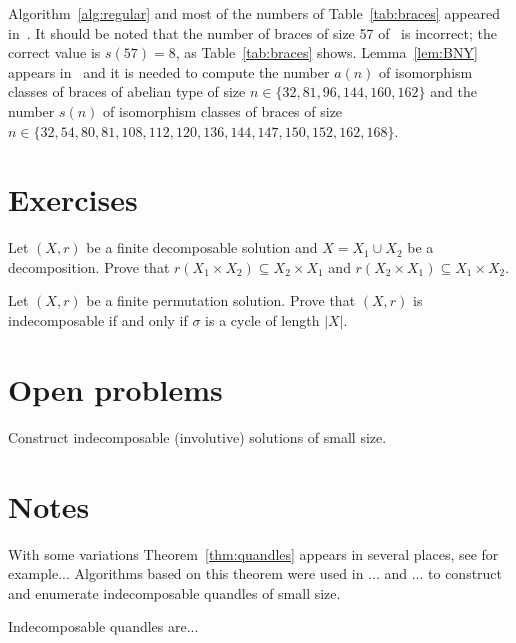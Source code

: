 Algorithm~\ref{alg:regular} and most of the numbers of Table~\ref{tab:braces} appeared in~\cite{MR3647970}. 
It should be noted that the number of braces of size 57 of~\cite{MR3647970} is incorrect;
the correct value is $s(57)=8$, as Table~\ref{tab:braces} shows. 
Lemma~\ref{lem:BNY} appears in~\cite{MR4113853} and it is needed to compute the number 
$a(n)$ of isomorphism classes of braces of abelian type of size $n\in\{32,81,96,144,160,162\}$ and 
the number 
$s(n)$ of isomorphism classes of braces of size 
$n\in\{32,54,80,81,108,112,120,136,144,147,150,152,162,168\}$. 


\section*{Exercises}

\begin{prob}
\label{prob:decomposition}
Let $(X,r)$ be a finite decomposable solution and $X=X_1\cup X_2$ be a decomposition. Prove that
$r(X_1\times X_2)\subseteq X_2\times X_1$ and 
$r(X_2\times X_1)\subseteq X_1\times X_2$. 
\end{prob}

\begin{prob}
Let $(X,r)$ be a finite  permutation solution. 
Prove that $(X,r)$ is indecomposable if and only if $\sigma$ is a cycle of length $|X|$.
\end{prob}


\section*{Open problems}

\begin{problem}
Construct indecomposable (involutive) solutions of small size. 
\end{problem}

\section*{Notes}

With some variations Theorem~\ref{thm:quandles} appears in several places, 
see for example... Algorithms based on this theorem
were used in ... and ... to construct and enumerate indecomposable 
quandles of small size. 

Indecomposable quandles are...

